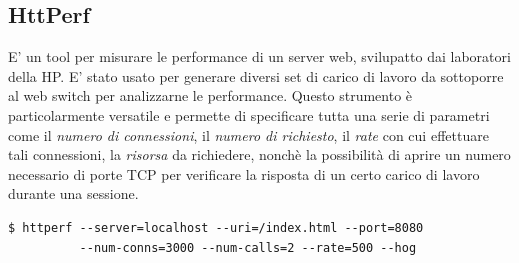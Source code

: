 \documentclass[italian]{tktltiki2}
\begin{document}
\subsection{HttPerf} \label{ssec: httperf}
E' un tool per misurare le performance di un server web, svilupatto dai laboratori della HP\cite{httperf}. E' stato usato per generare diversi set di carico di lavoro da sottoporre al web switch per analizzarne le performance. Questo strumento è particolarmente versatile e permette di specificare tutta una serie di parametri come il \emph{numero di connessioni}, il \emph{numero di richiesto}, il \emph{rate} con cui effettuare tali connessioni, la \emph{risorsa} da richiedere, nonchè la possibilità di aprire un numero necessario di porte TCP per verificare la risposta di un certo carico di lavoro durante una sessione.
\begin{lstlisting}
$ httperf --server=localhost --uri=/index.html --port=8080 
          --num-conns=3000 --num-calls=2 --rate=500 --hog

\end{lstlisting}
\end{document}

